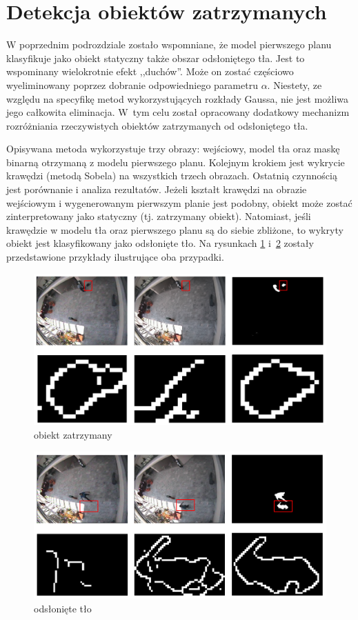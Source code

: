 \documentclass[10pt,a4paper]{article}
\begin{document}
\section{Detekcja obiektów zatrzymanych}
\label{sec:detekcja_statyczna}

W poprzednim podrozdziale zostało wspomniane, że model pierwszego planu klasyfikuje jako obiekt statyczny także obszar odsłoniętego tła. Jest to wspominany wielokrotnie efekt ,,duchów''. Może on zostać częściowo wyeliminowany poprzez dobranie odpowiedniego parametru $\alpha$. Niestety, ze względu na specyfikę metod wykorzystujących rozkłady Gaussa, nie jest możliwa jego całkowita eliminacja. W~tym celu został opracowany dodatkowy mechanizm rozróżniania rzeczywistych obiektów zatrzymanych od odsłoniętego tła. 

Opisywana metoda wykorzystuje trzy obrazy: wejściowy, model tła oraz maskę binarną otrzymaną z modelu pierwszego planu. Kolejnym krokiem jest wykrycie krawędzi (metodą Sobela) na wszystkich trzech obrazach. Ostatnią czynnością jest porównanie i analiza rezultatów. Jeżeli kształt krawędzi na obrazie wejściowym i wygenerowanym pierwszym planie jest podobny, obiekt może zostać zinterpretowany jako statyczny (tj. zatrzymany obiekt). Natomiast, jeśli krawędzie w modelu tła oraz pierwszego planu są do siebie zbliżone, to wykryty obiekt jest klasyfikowany jako odsłonięte tło. Na rysunkach \ref{stoppedObj} i~\ref{revBg} zostały przedstawione przykłady ilustrujące oba przypadki.

\begin{figure}[h]
	\centering
    \includegraphics[scale=0.5]{img/stoppedObject.png}
		\caption{obiekt zatrzymany}
		\label{stoppedObj}
\end{figure}

\begin{figure}[h]
		\centering
		\includegraphics[scale=0.5]{img/revealedBg.png}
		\caption{odsłonięte tło}
		\label{revBg}
\end{figure}
\end{document}
